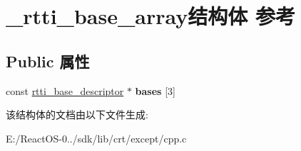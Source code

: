 \hypertarget{struct__rtti__base__array}{}\section{\+\_\+rtti\+\_\+base\+\_\+array结构体 参考}
\label{struct__rtti__base__array}
\subsection*{Public 属性}
\begin{DoxyCompactItemize}
\item 
\mbox{\label{struct__rtti__base__array_a457ba07d69ec66fec9fdc294a47eaa91}} 
const \hyperlink{struct__rtti__base__descriptor}{rtti\+\_\+base\+\_\+descriptor} $\ast$ {\bfseries bases} \mbox{[}3\mbox{]}
\end{DoxyCompactItemize}


该结构体的文档由以下文件生成\+:\begin{DoxyCompactItemize}
\item 
E\+:/\+React\+O\+S-\/0../sdk/lib/crt/except/cpp.\+c\end{DoxyCompactItemize}
